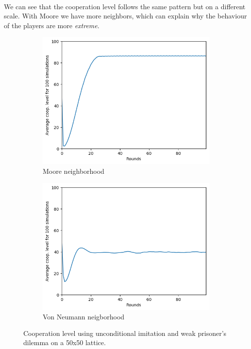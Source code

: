 \documentclass[letterpaper]{article}
\begin{document}
\paragraph{}

We can see that the cooperation level follows the same pattern but on a
different scale. With Moore we have more neighbors, which can explain
why the behaviour of the players are more \textit{extreme}.

\begin{figure}[H]
    \begin{subfigure}{.5\textwidth}
        \centering
        \includegraphics[width=1\linewidth]{images/assign2/50-part1}
        \caption{Moore neighborhood}
        \label{fig:50moorepart1}
    \end{subfigure}
    \begin{subfigure}{.5\textwidth}
        \centering
        \includegraphics[width=1\linewidth]{images/assign2/50_vonneumann-part1}
        \caption{Von Neumann neigborhood}
        \label{fig:50vonpart1}
    \end{subfigure}
    \caption{Cooperation level using unconditional imitation and
    weak prisoner's dilemma on a 50x50 lattice.}
    \label{fig:50part1}
\end{figure}
\end{document}
